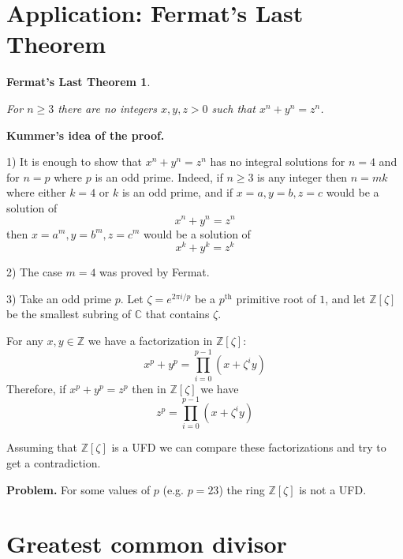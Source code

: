 \documentclass[12pt, letterpaper, oneside]{article}
\theoremstyle{plain}
\newtheorem{FLT}[theorem]{Fermat's Last Theorem}
\theoremstyle{definition}
\newcommand{\Z}{{\mathbb Z}}
\newcommand{\C}{{\mathbb C}}
\newcommand{\vs}{\vskip 5mm}
\begin{document}


\newpage
\section{Application: Fermat's Last Theorem}
\label{SEC_FERMATLASTTHM}



\begin{FLT}\ 

\label{THM_FLT}
For $n\geq 3$ there are no integers $x, y, z > 0$ such that $x^{n}+y^{n}=z^{n}$.
\end{FLT}


\vs

\textbf{Kummer's idea of the proof.}

1) It is enough to show that $x^{n}+y^{n}=z^{n}$ has no integral solutions for 
$n=4$ and for $n=p$ where $p$ is an odd prime. Indeed, if $n\geq 3$ is any integer 
then $n = mk$ where either $k=4$ or $k$ is an odd prime, and  if $x=a, y=b, z=c$
would  be a solution  of 
$$x^{n}+y^{n}=z^{n}$$ 
then $x=a^{m}, y=b^{m}, z=c^{m}$ would be a solution of 
$$x^{k}+y^{k}=z^{k}$$

\vs


2) The case $m=4$ was proved by Fermat.


\vs

3) Take an odd prime $p$. Let  $\zeta = e^{2\pi i/p}$ be a $p^{\text{th}}$ 
primitive root of $1$, and let $\Z[\zeta]$ be the smallest subring of $\C$ that contains $\zeta$.

For any $x, y\in \Z$ we have a factorization in $\Z[\zeta]$:
$$x^{p} +y^{p} = \prod_{i=0}^{p-1}(x+\zeta^{i}y)$$ 
Therefore, if $x^{p}+y^{p}=z^{p}$ then in $\Z[\zeta]$ we have 
$$z^{p} = \prod_{i=0}^{p-1}(x+\zeta^{i}y)$$ 

Assuming that $\Z[\zeta]$ is a UFD we can compare these factorizations and try to get 
a contradiction. 
 
 
\textbf{Problem.} For some values of $p$ (e.g. $p=23$) the ring $\Z[\zeta]$ is not a UFD.  
  
  




\newpage
\section{Greatest common divisor}
\label{SEC_GCD}
 
\end{document}
